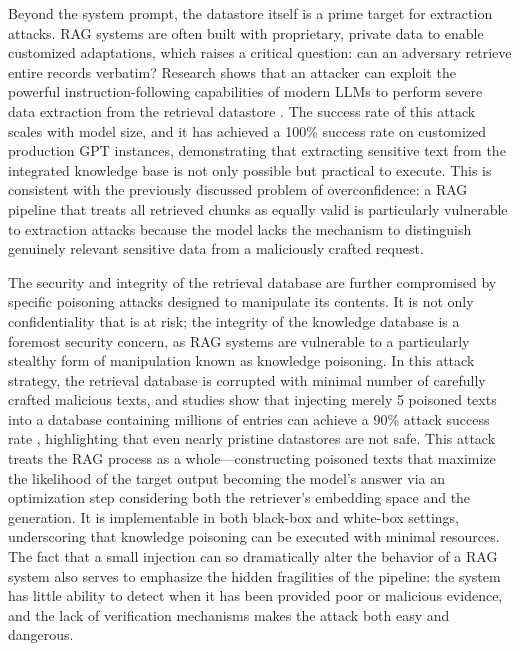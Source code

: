 \documentclass[11pt]{article}
\begin{document}
Beyond the system prompt, the datastore itself is a prime target for extraction attacks. RAG systems are often built with proprietary, private data to enable customized adaptations, which raises a critical question: can an adversary retrieve entire records verbatim? Research shows that an attacker can exploit the powerful instruction-following capabilities of modern LLMs to perform severe data extraction from the retrieval datastore \cite{ref222}. The success rate of this attack scales with model size, and it has achieved a 100\% success rate on customized production GPT instances, demonstrating that extracting sensitive text from the integrated knowledge base is not only possible but practical to execute. This is consistent with the previously discussed problem of overconfidence: a RAG pipeline that treats all retrieved chunks as equally valid is particularly vulnerable to extraction attacks because the model lacks the mechanism to distinguish genuinely relevant sensitive data from a maliciously crafted request.

The security and integrity of the retrieval database are further compromised by specific poisoning attacks designed to manipulate its contents. It is not only confidentiality that is at risk; the integrity of the knowledge database is a foremost security concern, as RAG systems are vulnerable to a particularly stealthy form of manipulation known as knowledge poisoning. In this attack strategy, the retrieval database is corrupted with minimal number of carefully crafted malicious texts, and studies show that injecting merely 5 poisoned texts into a database containing millions of entries can achieve a 90\% attack success rate \cite{ref249}, highlighting that even nearly pristine datastores are not safe. This attack treats the RAG process as a whole---constructing poisoned texts that maximize the likelihood of the target output becoming the model's answer via an optimization step considering both the retriever's embedding space and the generation. It is implementable in both black-box and white-box settings, underscoring that knowledge poisoning can be executed with minimal resources. The fact that a small injection can so dramatically alter the behavior of a RAG system also serves to emphasize the hidden fragilities of the pipeline: the system has little ability to detect when it has been provided poor or malicious evidence, and the lack of verification mechanisms makes the attack both easy and dangerous.
\end{document}
